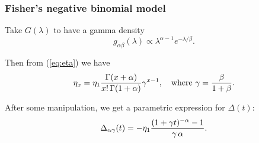\begin{frame}
    \frametitle{Fisher's negative binomial model}
	Take $G(\lambda)$ to have a gamma density
	$$g_{\alpha\beta}(\lambda) \propto \lambda^{\alpha-1}e^{-\lambda/\beta}.$$
	
	Then from (\ref{eq:eta}) we have
	\begin{equation}
		\eta_x = \eta_1{\Gamma(x+\alpha)\over x!\,\Gamma(1+\alpha)}\gamma^{x-1}, \quad\mbox{where\ } \gamma = {\beta \over 1+\beta}.
		\label{eq:fisher}
	\end{equation}
	
	After some manipulation, we get a parametric expression for $\Delta(t):$
	\begin{equation}
		\Delta_{\alpha\gamma}(t) = -\eta_1{(1+\gamma t)^{-\alpha}-1 \over \gamma\,\alpha}.
		\label{eq:deltaAG}
	\end{equation}
\end{frame}
